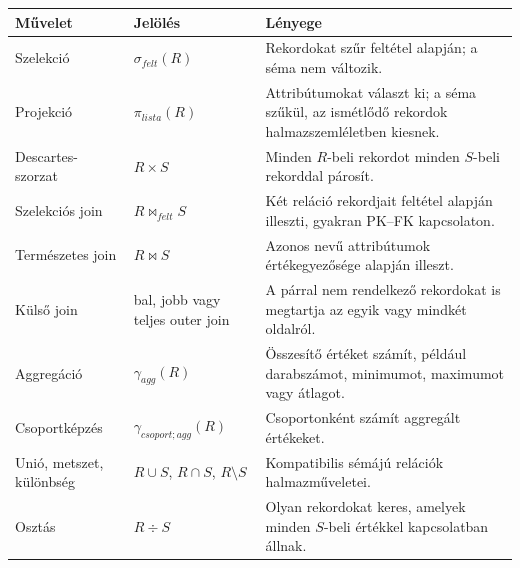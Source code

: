 \begin{tabularx}{\textwidth}{L{28mm}L{31mm}X}
\toprule
\textbf{Művelet} & \textbf{Jelölés} & \textbf{Lényege} \\
\midrule
Szelekció & $\sigma_{felt}(R)$ & Rekordokat szűr feltétel alapján; a séma nem változik. \\
Projekció & $\pi_{lista}(R)$ & Attribútumokat választ ki; a séma szűkül, az ismétlődő rekordok halmazszemléletben kiesnek. \\
Descartes-szorzat & $R \times S$ & Minden $R$-beli rekordot minden $S$-beli rekorddal párosít. \\
Szelekciós join & $R \bowtie_{felt} S$ & Két reláció rekordjait feltétel alapján illeszti, gyakran PK--FK kapcsolaton. \\
Természetes join & $R \bowtie S$ & Azonos nevű attribútumok értékegyezősége alapján illeszt. \\
Külső join & bal, jobb vagy teljes outer join & A párral nem rendelkező rekordokat is megtartja az egyik vagy mindkét oldalról. \\
Aggregáció & $\gamma_{agg}(R)$ & Összesítő értéket számít, például darabszámot, minimumot, maximumot vagy átlagot. \\
Csoportképzés & $\gamma_{csoport;agg}(R)$ & Csoportonként számít aggregált értékeket. \\
Unió, metszet, különbség & $R \cup S$, $R \cap S$, $R \setminus S$ & Kompatibilis sémájú relációk halmazműveletei. \\
Osztás & $R \div S$ & Olyan rekordokat keres, amelyek minden $S$-beli értékkel kapcsolatban állnak. \\
\bottomrule
\end{tabularx}

